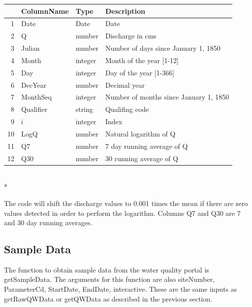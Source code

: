 \documentclass[a4paper,11pt]{article}
\begin{document}
\begin{tabular}{rlll}
  \hline
 & ColumnName & Type & Description \\ 
  \hline
1 & Date & Date & Date \\ 
  2 & Q & number & Discharge in cms \\ 
  3 & Julian & number & Number of days since January 1, 1850 \\ 
  4 & Month & integer & Month of the year [1-12] \\ 
  5 & Day & integer & Day of the year [1-366] \\ 
  6 & DecYear & number & Decimal year \\ 
  7 & MonthSeq & integer & Number of months since January 1, 1850 \\ 
  8 & Qualifier & string & Qualifing code \\ 
  9 & i & integer & Index \\ 
  10 & LogQ & number & Natural logarithm of Q \\ 
  11 & Q7 & number & 7 day running average of Q \\ 
  12 & Q30 & number & 30 running average of Q \\ 
   \hline
\end{tabular}\\*

The code will shift the discharge values to 0.001 times the mean if there are zero values detected in order to perform the logarithm. Columns Q7 and Q30 are 7 and 30 day running averages. 

\subsection{Sample Data}
The function to obtain sample data from the water quality portal is getSampleData. The arguments for this function are also siteNumber, ParameterCd, StartDate, EndDate, interactive. These are the same inputs as getRawQWData or getQWData as described in the previous section.
\end{document}
